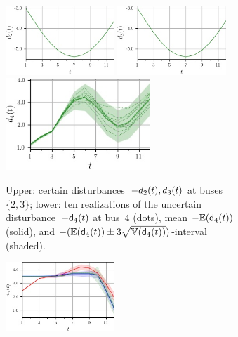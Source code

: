 \documentclass[final,3p,times,twocolumn]{elsarticle}  %
\begin{document}
\begin{figure}
    \begin{subfigure}[c]{\figwidth}
        \centering
        \includegraphics[width=0.45\textwidth]{figures/time series/case5_volatile/certain_disturbance_2.jpg}
        \includegraphics[width=0.45\textwidth]{figures/time series/case5_volatile/certain_disturbance_3.jpg}
        \includegraphics[width=0.6\textwidth, height=0.3\textwidth]{figures/time series/case5_volatile/uncertain_disturbance_4.jpg}
        \vspace{-2mm}
        \caption{Upper: certain disturbances~$-d_{2}(t), d_{3}(t)$ at buses $\{2,3\}$; lower: ten realizations of the uncertain disturbance~$-\mathsf{d}_4(t)$ at bus~$4$ (dots), mean $-\mathbb{E}(\mathsf{d}_4(t))$ (solid), and $-(\mathbb{E}(\mathsf{d}_4(t)) \pm 3\sqrt{\mathbb{V}(\mathsf{d}_4(t))})$-interval (shaded).}
        \label{fig:case5:Loads_volatile}
    \end{subfigure}
	\begin{subfigure}[c]{\figwidth}
		\centering
        \includegraphics[width=0.45\textwidth]{figures/time series/case5_volatile/gen_u_8101.jpg}~

\end{subfigure}
\end{figure}
\end{document}
